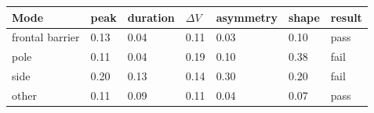 \begin{tabular}{lllllll}
\hline
Mode & peak & duration & $\Delta V$ & asymmetry & shape & result \\
\hline
frontal barrier & 0.13 & 0.04 & 0.11 & 0.03 & 0.10 & pass \\
pole & 0.11 & 0.04 & 0.19 & 0.10 & 0.38 & fail \\
side & 0.20 & 0.13 & 0.14 & 0.30 & 0.20 & fail \\
other & 0.11 & 0.09 & 0.11 & 0.04 & 0.07 & pass \\
\hline
\end{tabular}

